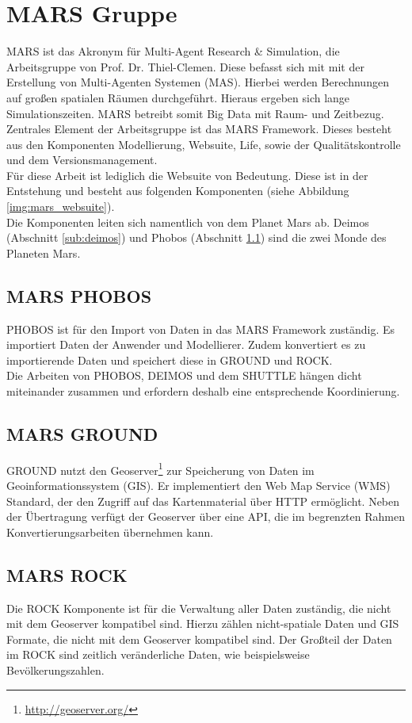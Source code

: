 \documentclass[10pt,conference,compsocconf]{IEEEtran}
\begin{document}
\section{MARS Gruppe}
MARS ist das Akronym für Multi-Agent Research \& Simulation, die Arbeitsgruppe von Prof. Dr. Thiel-Clemen. Diese befasst sich mit mit der Erstellung von Multi-Agenten Systemen (MAS). Hierbei werden Berechnungen auf großen spatialen Räumen durchgeführt. Hieraus ergeben sich lange Simulationszeiten. MARS betreibt somit Big Data mit Raum- und Zeitbezug.\\
Zentrales Element der Arbeitsgruppe ist das MARS Framework. Dieses besteht aus den Komponenten Modellierung, Websuite, Life, sowie der Qualitätskontrolle und dem Versionsmanagement.\\
Für diese Arbeit ist lediglich die Websuite von Bedeutung. Diese ist in der Entstehung und besteht aus folgenden Komponenten (siehe Abbildung \ref{img:mars_websuite}).\\
Die Komponenten leiten sich namentlich von dem Planet Mars ab. Deimos (Abschnitt \ref{sub:deimos}) und Phobos (Abschnitt \ref{sub:phobos}) sind die zwei Monde des Planeten Mars.

\subsection{MARS PHOBOS}
\label{sub:phobos}
PHOBOS ist für den Import von Daten in das MARS Framework zuständig. Es importiert Daten der Anwender und Modellierer. Zudem konvertiert es zu importierende Daten und speichert diese in GROUND und ROCK.\\
Die Arbeiten von PHOBOS, DEIMOS und dem SHUTTLE hängen dicht miteinander zusammen und erfordern deshalb eine entsprechende Koordinierung.

\subsection{MARS GROUND}
GROUND nutzt den Geoserver\footnote{\url{http://geoserver.org/}} zur Speicherung von Daten im Geoinformationssystem (GIS). Er implementiert den Web Map Service (WMS) Standard, der den Zugriff auf das Kartenmaterial über HTTP ermöglicht. Neben der Übertragung verfügt der Geoserver über eine API, die im begrenzten Rahmen Konvertierungsarbeiten übernehmen kann.

\subsection{MARS ROCK}
Die ROCK Komponente ist für die Verwaltung aller Daten zuständig, die nicht mit dem Geoserver kompatibel sind. Hierzu zählen nicht-spatiale Daten und GIS Formate, die nicht mit dem Geoserver kompatibel sind. Der Großteil der Daten im ROCK sind zeitlich veränderliche Daten, wie beispielsweise Bevölkerungszahlen.
\end{document}
